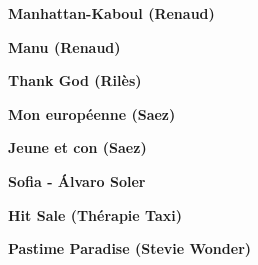 \documentclass{guitartabs}
\begin{document}
\begin{guitar}
\textbf{Manhattan-Kaboul (Renaud)}

\end{guitar}

\begin{guitar}
\textbf{Manu (Renaud)}

\end{guitar}

\begin{guitar}
\textbf{Thank God (Rilès)}

\end{guitar}

\begin{guitar}
\textbf{Mon européenne (Saez)}

\end{guitar}


\begin{guitar}
\textbf{Jeune et con (Saez)}

\end{guitar}


\begin{guitar}
\textbf{Sofia - Álvaro Soler}

\end{guitar}


\begin{guitar}
\textbf{Hit Sale (Thérapie Taxi)}

\end{guitar}


\begin{guitar}
\textbf{Pastime Paradise (Stevie Wonder)}

\end{guitar}
\end{document}
